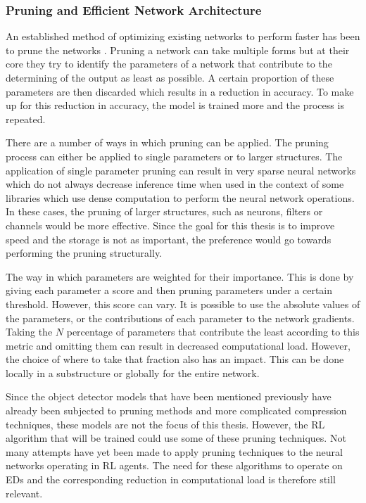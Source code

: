 \subsubsection{Pruning and Efficient Network Architecture}
An established method of optimizing existing networks to perform faster has been 
to prune the networks \cite{pruning}. Pruning a network can take multiple forms but 
at their core they try to identify the parameters of a network that contribute to the 
determining of the output as least as possible. A certain proportion of these 
parameters are then discarded which results in a reduction in accuracy. To make up 
for this reduction in accuracy, the model is trained more and the process is repeated. 

There are a number of ways in which pruning can be applied. The pruning process can 
either be applied to single parameters or to larger structures. The application of 
single parameter pruning can result in very sparse neural networks which do not 
always decrease inference time when used in the context of some libraries which 
use dense computation to perform the neural network operations. In these cases, the 
pruning of larger structures, such as neurons, filters or channels would 
be more effective. Since the goal for this thesis is to improve speed and the 
storage is not as important, the preference would go towards performing the 
pruning structurally. 

The way in which parameters are weighted for their importance. This is done 
by giving each parameter a score and then pruning parameters under a certain 
threshold. However, this score can vary. It is possible to use the absolute values
of the parameters, or the contributions of each parameter to the network gradients. 
Taking the $N$ percentage of parameters that contribute the least according to this
metric and omitting them can result in decreased computational load. However, the 
choice of where to take that fraction also has an impact. This can be done locally 
in a substructure or globally for the entire network. 

Since the object detector models that have been mentioned previously have already 
been subjected to pruning methods and more complicated compression techniques, these 
models are not the focus of this thesis. However, the RL algorithm that will be 
trained could use some of these pruning techniques. Not many attempts have yet been 
made to apply pruning techniques to the neural networks operating in RL agents. 
The need for these algorithms to operate on EDs and the corresponding reduction 
in computational load is therefore still relevant. 

